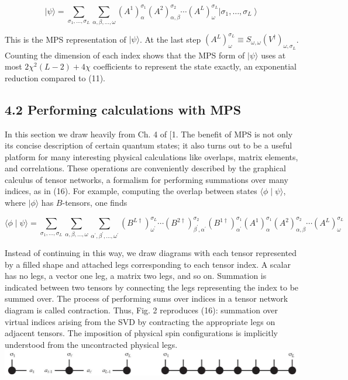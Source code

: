 \documentclass[12pt]{article}
\begin{document}
\begin{equation*}
|\psi\rangle=\sum_{\sigma_{1}, \ldots, \sigma_{L}} \sum_{\alpha, \beta, \ldots, \omega}\left(A^{1}\right)_{\alpha}^{\sigma_{1}}\left(A^{2}\right)_{\alpha, \beta}^{\sigma_{2}} \cdots\left(A^{L}\right)_{\omega}^{\sigma_{L}}\left|\sigma_{1}, \ldots, \sigma_{L}\right\rangle \tag{16}
\end{equation*}


This is the MPS representation of $|\psi\rangle$. At the last step $\left(A^{L}\right)_{\omega}^{\sigma_{L}} \equiv S_{\omega, \omega}\left(V^{\dagger}\right)_{\omega, \sigma_{L}}$. Counting the dimension of each index shows that the MPS form of $|\psi\rangle$ uses at most $2 \chi^{2}(L-2)+4 \chi$ coefficients to represent the state exactly, an exponential reduction compared to (11).

\subsection*{4.2 Performing calculations with MPS}
In this section we draw heavily from Ch. 4 of [1. The benefit of MPS is not only its concise description of certain quantum states; it also turns out to be a useful platform for many interesting physical calculations like overlaps, matrix elements, and correlations. These operations are conveniently described by the graphical calculus of tensor networks, a formalism for performing summations over many indices, as in (16). For example, computing the overlap between states $\langle\phi \mid \psi\rangle$, where $|\phi\rangle$ has $B$-tensors, one finds


\begin{equation*}
\langle\phi \mid \psi\rangle=\sum_{\sigma_{1}, \ldots, \sigma_{L}} \sum_{\alpha, \beta, \ldots, \omega} \sum_{\alpha^{\prime}, \beta^{\prime}, \ldots, \omega^{\prime}}\left(B^{L \dagger}\right)_{\omega^{\prime}}^{\sigma_{L}} \cdots\left(B^{2 \dagger}\right)_{\beta^{\prime}, \alpha^{\prime}}^{\sigma_{2}}\left(B^{1 \dagger}\right)_{\alpha^{\prime}}^{\sigma_{1}}\left(A^{1}\right)_{\alpha}^{\sigma_{1}}\left(A^{2}\right)_{\alpha, \beta}^{\sigma_{2}} \cdots\left(A^{L}\right)_{\omega}^{\sigma_{L}} \tag{17}
\end{equation*}


Instead of continuing in this way, we draw diagrams with each tensor represented by a filled shape and attached legs corresponding to each tensor index. A scalar has no legs, a vector one leg, a matrix two legs, and so on. Summation is indicated between two tensors by connecting the legs representing the index to be summed over. The process of performing sums over indices in a tensor network diagram is called contraction. Thus, Fig. 2 reproduces (16): summation over virtual indices arising from the SVD by contracting the appropriate legs on adjacent tensors. The imposition of physical spin configurations is implicitly understood from the uncontracted physical legs.\\
\includegraphics[max width=\textwidth, center]{2024_04_17_aea350b0a5e2209a42f2g-07}
\end{document}
